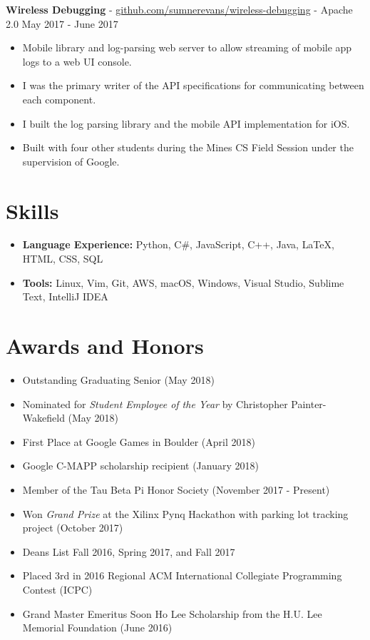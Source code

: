 \documentclass[10pt,letterpaper]{article}
\begin{document}
\textbf{Wireless Debugging} -
\href{https://github.com/sumnerevans/wireless-debugging}{github.com/sumnerevans/wireless-debugging}
- Apache 2.0 \hfill May 2017 - June 2017
\begin{itemize}
    \item Mobile library and log-parsing web server to allow streaming of mobile
        app logs to a web UI console.
    \item I was the primary writer of the API specifications for communicating
        between each component.
    \item I built the log parsing library and the mobile API implementation for
        iOS.
    \item Built with four other students during the Mines CS Field Session under
        the supervision of Google.
\end{itemize}

\section*{Skills}
{\renewcommand\labelitemi{}
    \renewcommand\leftmargini{0pt}
    \begin{itemize}
        \item \textbf{Language Experience:} Python, C\#, JavaScript, C++, Java,
            {\selectfont\LaTeX}, HTML, CSS, SQL
        \item \textbf{Tools:} Linux, Vim, Git, AWS, macOS, Windows, Visual
            Studio, Sublime Text, IntelliJ IDEA
    \end{itemize}
}

\section*{Awards and Honors}
\begin{itemize}
    \item Outstanding Graduating Senior (May 2018)
    \item Nominated for \textit{Student Employee of the Year} by Christopher
        Painter-Wakefield (May 2018)
    \item First Place at Google Games in Boulder (April 2018)
    \item Google C-MAPP scholarship recipient (January 2018)
    \item Member of the Tau Beta Pi Honor Society (November 2017 - Present)
    \item Won \textit{Grand Prize} at the Xilinx Pynq Hackathon with parking lot
        tracking project (October 2017)
    \item Deans List Fall 2016, Spring 2017, and Fall 2017
    \item Placed 3rd in 2016 Regional ACM International Collegiate Programming
        Contest (ICPC)
    \item Grand Master Emeritus Soon Ho Lee Scholarship from the H.U. Lee
        Memorial Foundation (June 2016)
\end{itemize}
\end{document}
